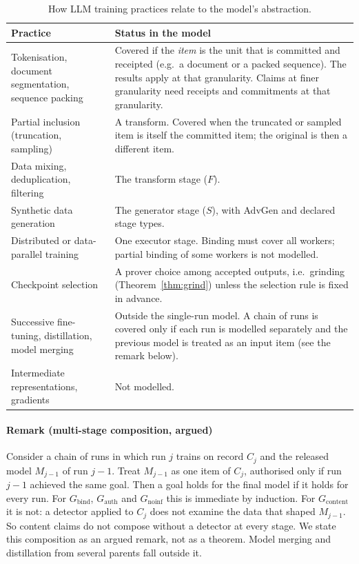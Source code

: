 \begin{table}[t]
\centering\scriptsize
\caption{How LLM training practices relate to the model's abstraction.}\label{tab:scope}
\begin{tabular}{@{}p{2.2cm}p{5.8cm}@{}}
\toprule
Practice & Status in the model\\
\midrule
Tokenisation, document segmentation, sequence packing & Covered if the \emph{item} is the
unit that is committed and receipted (e.g.\ a document or a packed sequence). The results apply
at that granularity. Claims at finer granularity need receipts and commitments at that
granularity.\\
Partial inclusion (truncation, sampling) & A transform. Covered when the truncated or sampled
item is itself the committed item; the original is then a different item.\\
Data mixing, deduplication, filtering & The transform stage ($F$).\\
Synthetic data generation & The generator stage ($S$), with \textsf{AdvGen} and declared stage
types.\\
Distributed or data-parallel training & One executor stage. Binding must cover all workers;
partial binding of some workers is not modelled.\\
Checkpoint selection & A prover choice among accepted outputs, i.e.\ grinding
(Theorem~\ref{thm:grind}) unless the selection rule is fixed in advance.\\
Successive fine-tuning, distillation, model merging & Outside the single-run model. A chain
of runs is covered only if each run is modelled separately and the previous model is
treated as an input item (see the remark below).\\
Intermediate representations, gradients & Not modelled.\\
\bottomrule
\end{tabular}
\end{table}

\paragraph{Remark (multi-stage composition, argued)}
Consider a chain of runs in which run $j$ trains on record $C_j$ and the released model
$M_{j-1}$ of run $j-1$. Treat $M_{j-1}$ as one item of $C_j$, authorised only if run $j-1$
achieved the same goal. Then a goal holds for the final model if it holds for every run.
For $G_{\mathrm{bind}}$, $G_{\mathrm{auth}}$ and $G_{\mathrm{noinf}}$ this is immediate by
induction. For $G_{\mathrm{content}}$ it is not: a detector applied to $C_j$ does not
examine the data that shaped $M_{j-1}$. So content claims do not compose without a detector
at every stage. We state this composition as an argued remark, not as a theorem. Model
merging and distillation from several parents fall outside it.
